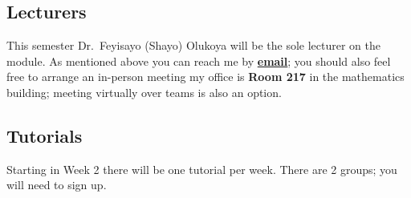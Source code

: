\documentclass[
  a4paper,
  oneside,
  final]{krantz}
\theoremstyle{definition}
\theoremstyle{definition}
\theoremstyle{definition}
\theoremstyle{definition}
\theoremstyle{remark}
\begin{document}
\hypertarget{lecturers}{%
\subsection*{Lecturers}\label{lecturers}}


This semester Dr.~Feyisayo (Shayo) Olukoya will be the sole lecturer on the module. As mentioned above you can reach me by \textbf{\href{fo55@st-andrews.ac.uk}{email}}; you should also feel free to arrange an in-person meeting my office is \textbf{Room 217} in the mathematics building; meeting virtually over teams is also an option.

\hypertarget{tutorials}{%
\subsection*{Tutorials}\label{tutorials}}


Starting in Week 2 there will be one tutorial per week. There are 2 groups; you will need to sign up.

 
  \providecommand{\huxb}[2]{\arrayrulecolor[RGB]{#1}\global\arrayrulewidth=#2pt}
  \providecommand{\huxvb}[2]{\color[RGB]{#1}\vrule width #2pt}
  \providecommand{\huxtpad}[1]{\rule{0pt}{#1}}
  \providecommand{\huxbpad}[1]{\rule[-#1]{0pt}{#1}}
\end{document}

